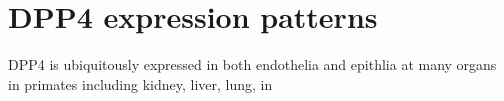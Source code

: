 \section{DPP4 expression patterns}
DPP4 is ubiquitously expressed in both endothelia and epithlia at many organs in primates including kidney, liver, lung, in